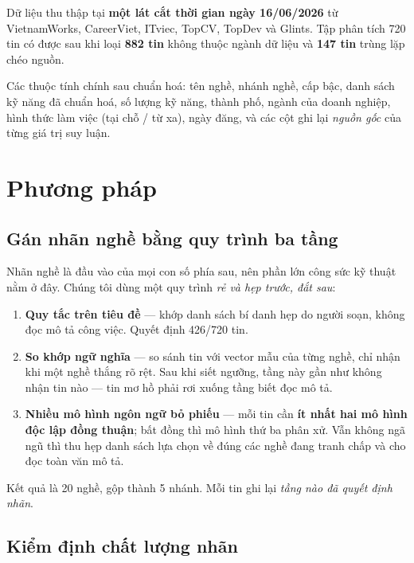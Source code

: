 \documentclass[10pt]{article}
\begin{document}
Dữ liệu thu thập tại \textbf{một lát cắt thời gian ngày 16/06/2026} từ VietnamWorks, CareerViet, ITviec,
TopCV, TopDev và Glints. Tập phân tích 720 tin có được sau khi loại \textbf{882 tin} không thuộc ngành
dữ liệu và \textbf{147 tin} trùng lặp chéo nguồn.

Các thuộc tính chính sau chuẩn hoá: tên nghề, nhánh nghề, cấp bậc, danh sách kỹ năng đã chuẩn hoá,
số lượng kỹ năng, thành phố, ngành của doanh nghiệp, hình thức làm việc (tại chỗ / từ xa), ngày đăng,
và các cột ghi lại \emph{nguồn gốc} của từng giá trị suy luận.

\section{Phương pháp}

\subsection{Gán nhãn nghề bằng quy trình ba tầng}

Nhãn nghề là đầu vào của mọi con số phía sau, nên phần lớn công sức kỹ thuật nằm ở đây. Chúng tôi dùng
một quy trình \emph{rẻ và hẹp trước, đắt sau}:

\begin{enumerate}
\item \textbf{Quy tắc trên tiêu đề} --- khớp danh sách bí danh hẹp do người soạn, không đọc mô tả công
      việc. Quyết định 426/720 tin.
\item \textbf{So khớp ngữ nghĩa} --- so sánh tin với vector mẫu của từng nghề, chỉ nhận khi một nghề
      thắng rõ rệt. Sau khi siết ngưỡng, tầng này gần như không nhận tin nào --- tin mơ hồ phải rơi
      xuống tầng biết đọc mô tả.
\item \textbf{Nhiều mô hình ngôn ngữ bỏ phiếu} --- mỗi tin cần \textbf{ít nhất hai mô hình độc lập đồng
      thuận}; bất đồng thì mô hình thứ ba phân xử. Vẫn không ngã ngũ thì thu hẹp danh sách lựa chọn về
      đúng các nghề đang tranh chấp và cho đọc toàn văn mô tả.
\end{enumerate}

Kết quả là 20 nghề, gộp thành 5 nhánh. Mỗi tin ghi lại \emph{tầng nào đã quyết định nhãn}.

\subsection{Kiểm định chất lượng nhãn}
\end{document}
